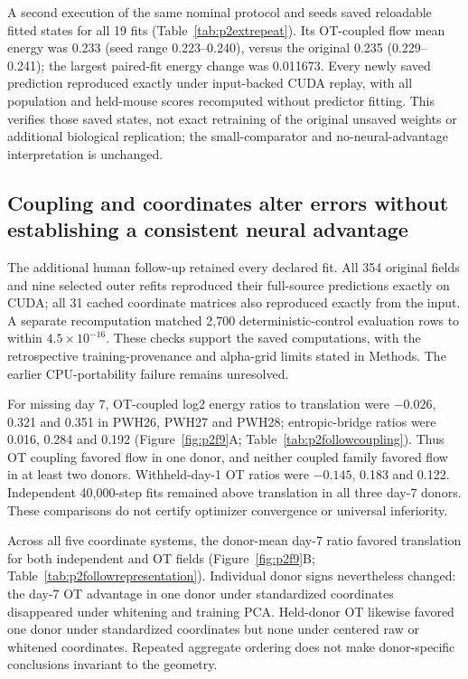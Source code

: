 \documentclass[10pt,a4paper]{article}
\begin{document}
A second execution of the same nominal protocol and seeds saved reloadable fitted states for all 19 fits (Table~\ref{tab:p2extrepeat}). Its OT-coupled flow mean energy was 0.233 (seed range 0.223--0.240), versus the original 0.235 (0.229--0.241); the largest paired-fit energy change was 0.011673. Every newly saved prediction reproduced exactly under input-backed CUDA replay, with all population and held-mouse scores recomputed without predictor fitting. This verifies those saved states, not exact retraining of the original unsaved weights or additional biological replication; the small-comparator and no-neural-advantage interpretation is unchanged.

\subsection{Coupling and coordinates alter errors without establishing a consistent neural advantage}
The additional human follow-up retained every declared fit. All 354 original fields and nine selected outer refits reproduced their full-source predictions exactly on CUDA; all 31 cached coordinate matrices also reproduced exactly from the input. A separate recomputation matched 2,700 deterministic-control evaluation rows to within $4.5\times10^{-16}$. These checks support the saved computations, with the retrospective training-provenance and alpha-grid limits stated in Methods. The earlier CPU-portability failure remains unresolved.

For missing day 7, OT-coupled log2 energy ratios to translation were $-0.026$, 0.321 and 0.351 in PWH26, PWH27 and PWH28; entropic-bridge ratios were 0.016, 0.284 and 0.192 (Figure~\ref{fig:p2f9}A\label{call:p2f9}; Table~\ref{tab:p2followcoupling}). Thus OT coupling favored flow in one donor, and neither coupled family favored flow in at least two donors. Withheld-day-1 OT ratios were $-0.145$, 0.183 and 0.122. Independent 40,000-step fits remained above translation in all three day-7 donors. These comparisons do not certify optimizer convergence or universal inferiority.

Across all five coordinate systems, the donor-mean day-7 ratio favored translation for both independent and OT fields (Figure~\ref{fig:p2f9}B; Table~\ref{tab:p2followrepresentation}). Individual donor signs nevertheless changed: the day-7 OT advantage in one donor under standardized coordinates disappeared under whitening and training PCA. Held-donor OT likewise favored one donor under standardized coordinates but none under centered raw or whitened coordinates. Repeated aggregate ordering does not make donor-specific conclusions invariant to the geometry.
\end{document}
